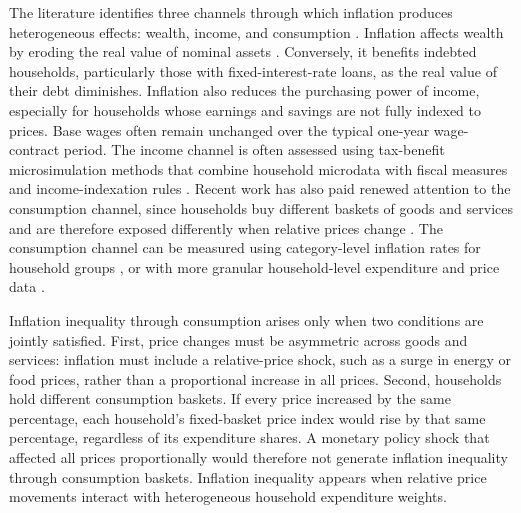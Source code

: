 \documentclass[11pt]{article}
\begin{document}



The literature identifies three channels through which inflation produces heterogeneous effects:
wealth, income, and consumption \citep{pallotti2024bears}. Inflation affects wealth by eroding the
real value of nominal assets \citep{doepke2006inflation,cardoso2022heterogeneous}. Conversely, it
benefits indebted households, particularly those with fixed-interest-rate loans, as the real value
of their debt diminishes. Inflation also reduces the purchasing power of income, especially for
households whose earnings and savings are not fully indexed to prices. Base wages often remain
unchanged over the typical one-year wage-contract period. The income channel is often assessed using
tax-benefit microsimulation methods that combine household microdata with fiscal measures and
income-indexation rules \citep{amores2025inflation}. Recent work has also paid renewed attention to
the consumption channel, since households buy different baskets of goods and services and are
therefore exposed differently when relative prices change
\citep{jaravel2021inflation,cravino2020household,argente2021cost}. The consumption channel can be
measured using category-level inflation rates for household groups \citep{hobijn2005inflation}, or
with more granular household-level expenditure and price data \citep{kaplan2017inflation}.

Inflation inequality through consumption arises only when two conditions are jointly
satisfied. First, price changes must be asymmetric across goods and services: inflation must include
a relative-price shock, such as a surge in energy or food prices, rather than a proportional
increase in all prices. Second, households hold different consumption baskets. If every price
increased by the same percentage, each household's fixed-basket price index would rise by that same
percentage, regardless of its expenditure shares. A monetary policy shock that affected all prices
proportionally would therefore not generate inflation inequality through consumption baskets. 
Inflation inequality appears when relative price movements
interact with heterogeneous household expenditure weights.
\end{document}

